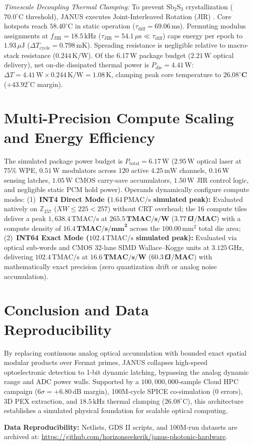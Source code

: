 \documentclass[letterpaper,10pt]{article}
\begin{document}
\textit{Timescale Decoupling Thermal Clamping:} To prevent $\text{Sb}_2\text{S}_3$ crystallization ($70.0^\circ\text{C}$ threshold), JANUS executes Joint-Interleaved Rotation (JIR) \cite{Tuckerman1981, Brunschwiler2009}. Core hotspots reach $58.40^\circ\text{C}$ in static operation ($\tau_{\text{diff}} = 69.06\,\text{ms}$). Permuting modulus assignments at $f_{\text{JIR}} = 18.5\,\text{kHz}$ ($\tau_{\text{JIR}} = 54.1\,\mu\text{s} \ll \tau_{\text{diff}}$) caps energy per epoch to $1.93\,\mu\text{J}$ ($\Delta T_{\text{cycle}} = 0.798\,\text{mK}$). Spreading resistance is negligible relative to macro-stack resistance ($0.244\,\text{K/W}$). Of the $6.17\,\text{W}$ package budget ($2.21\,\text{W}$ optical delivery), net on-die dissipated thermal power is $P_{\text{die}} = 4.41\,\text{W}$: $\Delta T = 4.41\,\text{W} \times 0.244\,\text{K/W} = 1.08\,\text{K}$, clamping peak core temperature to $\mathbf{26.08^\circ\text{C}}$ ($+43.92^\circ\text{C}$ margin).

\section{Multi-Precision Compute Scaling and Energy Efficiency}
The simulated package power budget is $P_{\text{total}} = 6.17\,\text{W}$ ($2.95\,\text{W}$ optical laser at $75\%$ WPE, $0.51\,\text{W}$ modulators across $120$ active $4.25\,\text{mW}$ channels, $0.16\,\text{W}$ sensing latches, $1.05\,\text{W}$ CMOS carry-save accumulators, $1.50\,\text{W}$ JIR control logic, and negligible static PCM hold power). Operands dynamically configure compute modes: (1)~\textbf{INT4 Direct Mode ($1.64\,\text{PMAC/s}$ simulated peak):} Evaluated natively on $\mathbb{Z}_{257}$ ($XW \le 225 < 257$) without CRT overhead; the 16 compute tiles deliver a peak $1,638.4\,\text{TMAC/s}$ at $\mathbf{265.5\,\text{TMAC/s/W}}$ ($\mathbf{3.77\,\text{fJ/MAC}}$) with a compute density of $\mathbf{16.4\,\text{TMAC/s/mm}^2}$ across the $100.00\,\text{mm}^2$ total die area; (2)~\textbf{INT64 Exact Mode ($102.4\,\text{TMAC/s}$ simulated peak):} Evaluated via optical sub-words and CMOS 32-lane SIMD Wallace--Kogge units at $3.125\,\text{GHz}$, delivering $102.4\,\text{TMAC/s}$ at $\mathbf{16.6\,\text{TMAC/s/W}}$ ($\mathbf{60.3\,\text{fJ/MAC}}$) with mathematically exact precision (zero quantization drift or analog noise accumulation).

\section{Conclusion and Data Reproducibility}
By replacing continuous analog optical accumulation with bounded exact spatial modular products over Fermat primes, JANUS collapses high-speed optoelectronic detection to 1-bit dynamic latching, bypassing the analog dynamic range and ADC power walls. Supported by a $100,000,000$-sample Cloud HPC campaign ($6\sigma = +6.80\,\text{dB}$ margin), 100M-cycle SPICE co-simulation ($0$ errors), 3D PEX extraction, and $18.5\,\text{kHz}$ thermal clamping ($26.08^\circ\text{C}$), this architecture establishes a simulated physical foundation for scalable optical computing.

\noindent\textbf{Data Reproducibility:} Netlists, GDS II scripts, and 100M-run datasets are archived at: \url{https://github.com/horizonseekerik/janus-photonic-hardware}.

\vspace{-4pt}
\begingroup
\fontsize{7.2pt}{8.4pt}\selectfont


\endgroup
\end{document}
